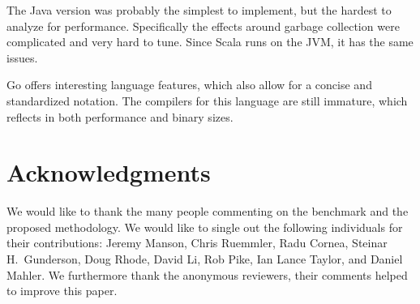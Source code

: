 The Java version was probably the simplest to implement,
but the hardest to analyze for performance. Specifically
the effects around garbage collection were complicated
and very hard to tune. Since Scala runs on the JVM, it has 
the same issues.

Go offers interesting language features, which also
allow for a concise and standardized notation. The compilers
for this language are still immature, which 
reflects in both performance and binary sizes.

\section{Acknowledgments}

We would like to thank the many people commenting on the benchmark and
the proposed methodology. We would like to single out the following
individuals for their contributions: Jeremy Manson, Chris Ruemmler,
Radu Cornea, Steinar H.~Gunderson, Doug Rhode, David Li, Rob Pike, Ian
Lance Taylor, and Daniel Mahler. We furthermore thank the anonymous
reviewers, their comments helped to improve this paper.
